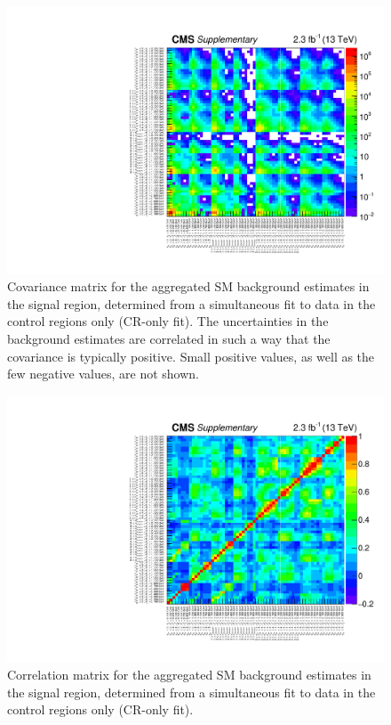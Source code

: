 \clearpage
\begin{figure}[!h]
  \begin{center}
    \includegraphics[width=\textwidth]{Supplementary/aggregated_covariance_aux.pdf} 
    \caption{Covariance matrix for the aggregated SM background
      estimates in the signal region, determined from a simultaneous
      fit to data in the control regions only (CR-only fit). The
      uncertainties in the background estimates are correlated in such
      a way that the covariance is typically positive. Small positive
      values, as well as the few negative values, are not shown.
      \label{fig:aggr_corr} 
    }
  \end{center}
\end{figure}

\clearpage
\begin{figure}[!h]
  \begin{center}
    \includegraphics[width=\textwidth]{Supplementary/aggregated_correlation_aux.pdf} 
    \caption{Correlation matrix for the aggregated SM background
      estimates in the signal region, determined from a simultaneous
      fit to data in the control regions only (CR-only fit).
      \label{fig:aggr_corr} 
    }
  \end{center}
\end{figure}

